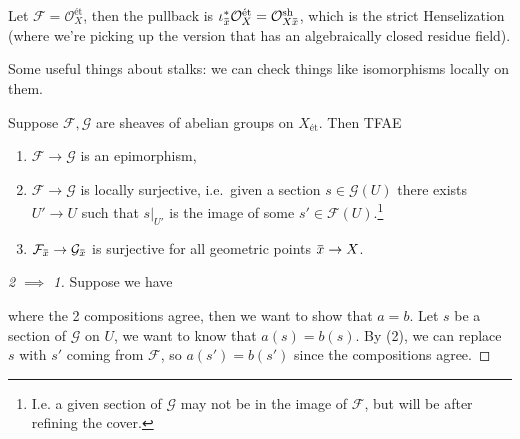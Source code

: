\begin{example}[?]

Let \(\mathcal{F} = {\mathcal{O}}_{X}^{\text{ét}}\), then the pullback
is
\(\iota_{\mkern 1.5mu\overline{\mkern-1.5mux\mkern-1.5mu}\mkern 1.5mu}^* {\mathcal{O}}_X^{\text{ét}} = {\mathcal{O}}_{X\mkern 1.5mu\overline{\mkern-1.5mux\mkern-1.5mu}\mkern 1.5mu}^{\mathrm{sh}}\),
which is the strict Henselization (where we're picking up the version
that has an algebraically closed residue field).

\end{example}

Some useful things about stalks: we can check things like isomorphisms
locally on them.

\begin{lemma}[?]

Suppose \(\mathcal{F}, \mathcal{G}\) are sheaves of abelian groups on
\(X_{\text{ét}}\). Then TFAE

\begin{enumerate}
\def\labelenumi{\arabic{enumi}.}
\tightlist
\item
  \(\mathcal{F}\to \mathcal{G}\) is an epimorphism,
\item
  \(\mathcal{F}\to \mathcal{G}\) is locally surjective, i.e.~given a
  section \(s\in \mathcal{G}(U)\) there exists \(U'\to U\) such that
  \({ \left.{{s}} \right|_{{U'}} }\) is the image of some
  \(s' \in \mathcal{F}(U)\).\footnote{I.e. a given section of
    \(\mathcal{G}\) may not be in the image of \(\mathcal{F}\), but will
    be after refining the cover.}
\item
  \(\mathcal{F}_{\mkern 1.5mu\overline{\mkern-1.5mux\mkern-1.5mu}\mkern 1.5mu} \to \mathcal{G}_{\mkern 1.5mu\overline{\mkern-1.5mux\mkern-1.5mu}\mkern 1.5mu}\)
  is surjective for all geometric points
  \(\mkern 1.5mu\overline{\mkern-1.5mux\mkern-1.5mu}\mkern 1.5mu\to X\).
\end{enumerate}

\end{lemma}

\begin{proof}[2 $\implies$ 1]

Suppose we have

where the 2 compositions agree, then we want to show that \(a=b\). Let
\(s\) be a section of \(\mathcal{G}\) on \(U\), we want to know that
\(a(s) = b(s)\). By (2), we can replace \(s\) with \(s'\) coming from
\(\mathcal{F}\), so \(a(s') = b(s')\) since the compositions agree.

\end{proof}

